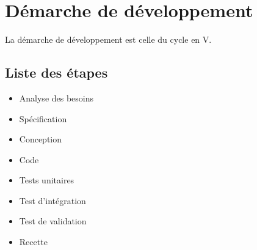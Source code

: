 \section{Démarche de développement}

La démarche de développement est celle du cycle en V.

\subsection{Liste des étapes}
    \begin{itemize}
        \item Analyse des besoins
        \item Spécification
        \item Conception
        \item Code
        \item Tests unitaires
        \item Test d'intégration
        \item Test de validation
        \item Recette
    \end{itemize}
